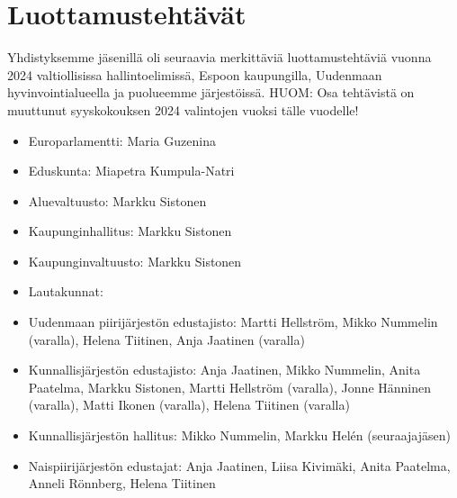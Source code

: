 \documentclass[a4paper,12pt]{article}
\begin{document}
\section{Luottamustehtävät}
Yhdistyksemme jäsenillä oli seuraavia merkittäviä luottamustehtäviä vuonna 2024 valtiollisissa hallintoelimissä, Espoon kaupungilla, Uudenmaan hyvinvointialueella ja puolueemme järjestöissä. HUOM: Osa tehtävistä on muuttunut syyskokouksen 2024 valintojen vuoksi tälle vuodelle!
\begin{itemize}
\item{Europarlamentti:} Maria Guzenina
\item{Eduskunta:} Miapetra Kumpula-Natri
\item{Aluevaltuusto:} Markku Sistonen
\item{Kaupunginhallitus:} Markku Sistonen
\item{Kaupunginvaltuusto:} Markku Sistonen
\item{Lautakunnat:}
\item{Uudenmaan piirijärjestön edustajisto:} Martti Hellström, Mikko Nummelin (varalla), Helena Tiitinen, Anja Jaatinen (varalla)
\item{Kunnallisjärjestön edustajisto:} Anja Jaatinen, Mikko Nummelin, Anita Paatelma, Markku Sistonen, Martti Hellström (varalla), Jonne Hänninen (varalla), Matti Ikonen (varalla), Helena Tiitinen (varalla)
\item{Kunnallisjärjestön hallitus:} Mikko Nummelin, Markku Helén (seuraajajäsen)
\item{Naispiirijärjestön edustajat:} Anja Jaatinen, Liisa Kivimäki, Anita Paatelma, Anneli Rönnberg, Helena Tiitinen
\end{itemize}
\end{document}
